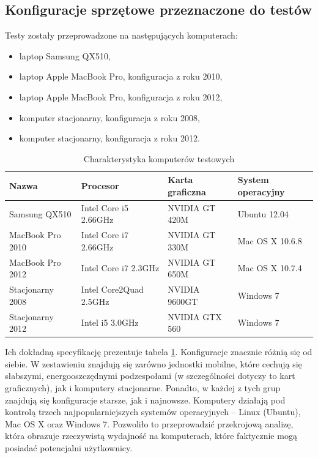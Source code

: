 \subsection{Konfiguracje sprzętowe przeznaczone do testów}
\label{sec:konfiguracjaKompow}

Testy zostały przeprowadzone na następujących komputerach:

\begin{itemize}

\item laptop Samsung QX510,
\item laptop Apple MacBook Pro, konfiguracja z roku 2010,
\item laptop Apple MacBook Pro, konfiguracja z roku 2012,
\item komputer stacjonarny, konfiguracja z roku 2008,
\item komputer stacjonarny, konfiguracja z roku 2012.

\end{itemize}

\begin{table}[!h]
\caption{Charakterystyka komputerów testowych}
\centering
\begin{tabular}{|l|l|l|l|}
\hline
Nazwa & Procesor & Karta graficzna & System operacyjny \\ \hline
Samsung QX510 & Intel Core i5 2.66GHz & NVIDIA GT 420M & Ubuntu 12.04 \\ \hline
MacBook Pro 2010 & Intel Core i7 2.66GHz & NVIDIA GT 330M & Mac OS X 10.6.8 \\ \hline
MacBook Pro 2012 & Intel Core i7 2.3GHz & NVIDIA GT 650M & Mac OS X 10.7.4 \\ \hline
Stacjonarny 2008 & Intel Core2Quad 2.5GHz & NVIDIA 9600GT & Windows 7 \\ \hline
Stacjonarny 2012 & Intel i5 3.0GHz & NVIDIA GTX 560 & Windows 7 \\ \hline
\end{tabular}
\label{tab:komputery}
\end{table}

Ich dokładną specyfikację prezentuje tabela \ref{tab:komputery}. Konfiguracje
znacznie różnią się od siebie. W zestawieniu znajdują się zarówno jednostki
mobilne, które cechują się słabszymi, energooszczędnymi podzespołami (w
szczególności dotyczy to kart graficznych), jak i komputery stacjonarne.
Ponadto, w każdej z tych grup znajdują się konfiguracje starsze, jak i
najnowsze. Komputery działają pod kontrolą trzech najpopularniejszych systemów
operacyjnych -- Linux (Ubuntu), Mac OS X oraz Windows 7. Pozwoliło to
przeprowadzić przekrojową analizę, która obrazuje rzeczywistą wydajność na
komputerach, które faktycznie mogą posiadać potencjalni użytkownicy.

